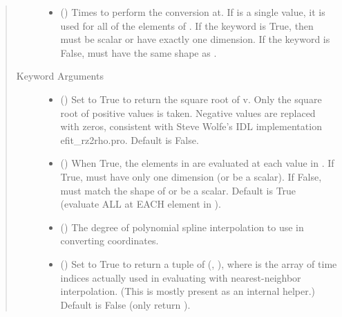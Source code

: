 \documentclass[letterpaper,10pt,english]{sphinxmanual}
\begin{document}
\begin{fulllineitems}
\begin{fulllineitems}
\begin{quote}
\begin{description}
\begin{itemize}
\item {} 
 () \textendash{} Times to perform the conversion at.
If  is a single value, it is used for all of the elements of
. If the  keyword is True, then  must be scalar
or have exactly one dimension. If the  keyword is False,
 must have the same shape as .

\end{itemize}

\item[{Keyword Arguments}] \leavevmode\begin{itemize}
\item {} 
 () \textendash{} Set to True to return the square root of v.
Only the square root of positive values is taken. Negative
values are replaced with zeros, consistent with Steve Wolfe’s
IDL implementation efit\_rz2rho.pro. Default is False.

\item {} 
 () \textendash{} When True, the elements in  are evaluated
at each value in . If True,  must have only one dimension
(or be a scalar). If False,  must match the shape of 
or be a scalar. Default is True (evaluate ALL  at EACH
element in ).

\item {} 
 () \textendash{} The degree of polynomial spline interpolation to
use in converting coordinates.

\item {} 
 () \textendash{} Set to True to return a tuple of (,
), where  is the array of time indices
actually used in evaluating  with nearest-neighbor
interpolation. (This is mostly present as an internal helper.)
Default is False (only return ).


\end{itemize}
\end{description}
\end{quote}
\end{fulllineitems}
\end{fulllineitems}
\end{document}
